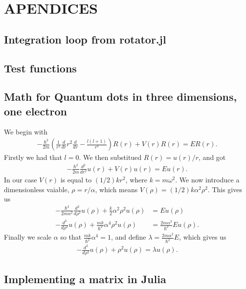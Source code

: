 \documentclass[a4paper]{article}
\begin{document}
\section{APENDICES}
\subsection{Integration loop from rotator.jl}\label{rotator.jl}

\subsection{Test functions}\label{opp_c.jl}

\subsection{Math for Quantum dots in three dimensions, one electron}\label{opp d math}
We begin with 
\begin{align}
- \frac{\hbar^2}{2m} \left( \frac{1}{r^2} \frac{d}{dr} r^2 \frac{d}{dr} - \frac{l(l+1)}{r^2}\right) R(r) + V(r) R(r) = ER(r).
\end{align}
Firstly we had that $l=0$. We then substitued $R(r) = u(r)/r$, and got
\begin{align}
  -\frac{\hbar^2}{2 m} \frac{d^2}{dr^2} u(r) 
+ V(r)u(r)  = E u(r) .
\end{align}
In our case $V(r)$ is equal to $(1/2)kr^2$, where $k=m\omega^2$. We now introduce a dimensionless vaiable, $\rho = r/\alpha$, which means $V(\rho) = (1/2) k \alpha^2\rho^2$. This gives us
\begin{align}
-\frac{\hbar^2}{2 m \alpha^2} \frac{d^2}{d\rho^2} u(\rho) 
+ \frac{k}{2} \alpha^2\rho^2u(\rho)  &= E u(\rho) \\
 -\frac{d^2}{d\rho^2} u(\rho) 
+ \frac{mk}{\hbar^2} \alpha^4\rho^2u(\rho)  &= \frac{2m\alpha^2}{\hbar^2}E u(\rho) .
\end{align}
Finally we scale $\alpha$ so that $\frac{mk}{\hbar^2} \alpha^4 = 1$, and define $\lambda = \frac{2m\alpha^2}{\hbar^2}E$, which gives us
\begin{align}
  -\frac{d^2}{d\rho^2} u(\rho) + \rho^2u(\rho)  = \lambda u(\rho) .
\end{align}


\subsection{Implementing a matrix in Julia}\label{opp_d matrix}

\end{document}
